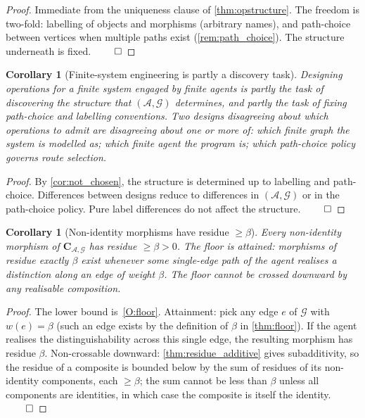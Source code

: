 \documentclass[11pt,a4paper]{article}
\theoremstyle{thmstyle}
\newtheorem{corollary}[theorem]{Corollary}
\theoremstyle{definition}
\theoremstyle{remark}
\newcommand{\Graph}{\mathcal{G}}
\newcommand{\Agent}{\mathcal{A}}
\newcommand{\floor}{\beta}
\begin{document}
\begin{proof}
Immediate from the uniqueness clause of \cref{thm:opstructure}.
The freedom is two-fold: labelling of objects and morphisms
(arbitrary names), and path-choice between vertices when multiple
paths exist (\cref{rem:path_choice}). The structure underneath is
fixed. $\qed$
\end{proof}

\begin{corollary}[Finite-system engineering is partly a discovery
task]
\label{cor:discovery}
Designing operations for a finite system engaged by finite agents
is partly the task of discovering the structure that
$(\Agent, \Graph)$ determines, and partly the task of fixing
path-choice and labelling conventions. Two designs disagreeing
about which operations to admit are disagreeing about one or more
of: which finite graph the system is modelled as; which finite
agent the program is; which path-choice policy governs route
selection.
\end{corollary}

\begin{proof}
By \cref{cor:not_chosen}, the structure is determined up to
labelling and path-choice. Differences between designs reduce to
differences in $(\Agent, \Graph)$ or in the path-choice policy.
Pure label differences do not affect the structure. $\qed$
\end{proof}

\begin{corollary}[Non-identity morphisms have residue
$\geq \floor$]
\label{cor:no_below}
Every non-identity morphism of $\mathbf{C}_{\Agent,\Graph}$ has
residue $\geq \floor > 0$. The floor is attained: morphisms of
residue exactly $\floor$ exist whenever some single-edge path of
the agent realises a distinction along an edge of weight $\floor$.
The floor cannot be crossed downward by any realisable composition.
\end{corollary}

\begin{proof}
The lower bound is~\ref{O:floor}. Attainment: pick any edge $e$ of
$\Graph$ with $w(e) = \floor$ (such an edge exists by the
definition of $\floor$ in \cref{thm:floor}). If the agent realises
the distinguishability across this single edge, the resulting
morphism has residue $\floor$. Non-crossable downward:
\cref{thm:residue_additive} gives subadditivity, so the residue of
a composite is bounded below by the sum of residues of its
non-identity components, each $\geq \floor$; the sum cannot be
less than $\floor$ unless all components are identities, in which
case the composite is itself the identity. $\qed$
\end{proof}
\end{document}
